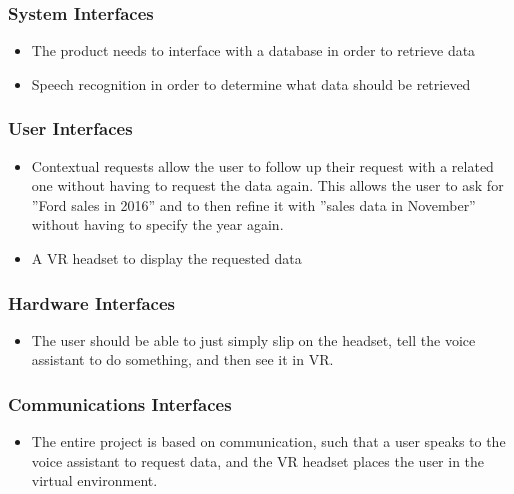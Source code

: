 \documentclass[onecolumn, draftclsnofoot,10pt, compsoc]{IEEEtran}
\begin{document}
        \subsubsection{System Interfaces}
            \begin{itemize}
                \item The product needs to interface with a database in order to retrieve data
                \item Speech recognition in order to determine what data should be retrieved
            \end{itemize}
        \subsubsection{User Interfaces}
            \begin{itemize}
                \item Contextual requests allow the user to follow up their request with a related one without having to request the data again. This allows the user to ask for ''Ford sales in 2016'' and to then refine it with ''sales data in November'' without having to specify the year again.
                \item A VR headset to display the requested data
            \end{itemize}

            \subsubsection{Hardware Interfaces}
            \begin{itemize}
                \item The user should be able to just simply slip on the headset, tell the voice assistant to do something, and then see it in VR.
            \end{itemize}

            \subsubsection{Communications Interfaces}
            \begin{itemize}
                \item The entire project is based on communication, such that a user speaks to the voice assistant to request data, and the VR headset places the user in the virtual environment.
            \end{itemize}
\end{document}

